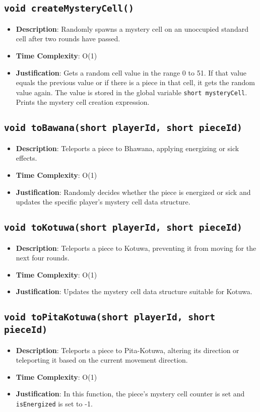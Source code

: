 \documentclass{article}
\begin{document}
\subsection{\texttt{void createMysteryCell()}}
\begin{itemize}
    \item \textbf{Description}: Randomly spawns a mystery cell on an unoccupied standard cell after two rounds have passed.
    \item \textbf{Time Complexity}: O(1)
    \item \textbf{Justification}: Gets a random cell value in the range 0 to 51. If that value equals the previous value or if there is a piece in that cell, it gets the random value again. The value is stored in the global variable \texttt{short mysteryCell}. Prints the mystery cell creation expression.
\end{itemize}

\subsection{\texttt{void toBawana(short playerId, short pieceId)}}
\begin{itemize}
    \item \textbf{Description}: Teleports a piece to Bhawana, applying energizing or sick effects.
    \item \textbf{Time Complexity}: O(1)
    \item \textbf{Justification}: Randomly decides whether the piece is energized or sick and updates the specific player's mystery cell data structure.
\end{itemize}

\subsection{\texttt{void toKotuwa(short playerId, short pieceId)}}
\begin{itemize}
    \item \textbf{Description}: Teleports a piece to Kotuwa, preventing it from moving for the next four rounds.
    \item \textbf{Time Complexity}: O(1)
    \item \textbf{Justification}: Updates the mystery cell data structure suitable for Kotuwa.
\end{itemize}

\subsection{\texttt{void toPitaKotuwa(short playerId, short pieceId)}}
\begin{itemize}
    \item \textbf{Description}: Teleports a piece to Pita-Kotuwa, altering its direction or teleporting it based on the current movement direction.
    \item \textbf{Time Complexity}: O(1)
    \item \textbf{Justification}: In this function, the piece's mystery cell counter is set and \texttt{isEnergized} is set to -1.
\end{itemize}
\end{document}
